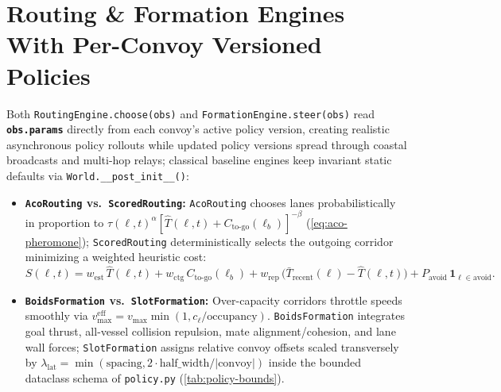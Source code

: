 \documentclass[11pt,a4paper,oneside]{report}
\begin{document}
\section[Routing \& Formation Engines]{Routing \& Formation Engines With Per-Convoy Versioned Policies}
\begin{sloppypar}
Both \texttt{RoutingEngine.choose(obs)} and \texttt{FormationEngine.steer(obs)} read \textbf{\texttt{obs.params}} directly from each convoy's active policy version, creating realistic asynchronous policy rollouts while updated policy versions spread through coastal broadcasts and multi-hop relays; classical baseline engines keep invariant static defaults via \texttt{World.\_\_post\_init\_\_()}:
\begin{itemize}
    \item \textbf{\texttt{AcoRouting} vs.\ \texttt{ScoredRouting}:} \texttt{AcoRouting} chooses lanes probabilistically in proportion to $\tau(\ell, t)^\alpha [\hat{T}(\ell,t) + C_{\text{to-go}}(\ell_b)]^{-\beta}$ (\autoref{eq:aco-pheromone}); \texttt{ScoredRouting} deterministically selects the outgoing corridor minimizing a weighted heuristic cost:
    \begin{equation}
    \label{eq:scored-route}
    S(\ell, t) = w_{\text{est}}\,\hat{T}(\ell, t) + w_{\text{ctg}}\,C_{\text{to-go}}(\ell_b) + w_{\text{rep}}\,\big(\bar{T}_{\text{recent}}(\ell) - \hat{T}(\ell, t)\big) + P_{\text{avoid}}\,\mathbf{1}_{\ell \in \text{avoid}}.
    \end{equation}
    \item \textbf{\texttt{BoidsFormation} vs.\ \texttt{SlotFormation}:} Over-capacity corridors throttle speeds smoothly via $v_{\max}^{\text{eff}} = v_{\max}\min(1, c_\ell / \text{occupancy})$. \texttt{BoidsFormation} integrates goal thrust, all-vessel collision repulsion, mate alignment/cohesion, and lane wall forces; \texttt{SlotFormation} assigns relative convoy offsets scaled transversely by $\lambda_{\text{lat}} = \min(\text{spacing}, 2\cdot\text{half\_width}/|\text{convoy}|)$ inside the bounded dataclass schema of \texttt{policy.py} (\autoref{tab:policy-bounds}).
\end{itemize}
\end{sloppypar}
\end{document}
